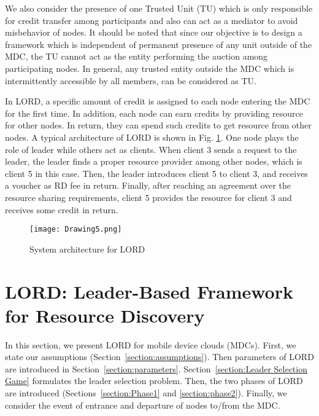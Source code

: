 \documentclass[journal,12pt, onecolumn]{IEEEtran}
\begin{document}
We also consider the presence of one Trusted Unit (TU) which is only responsible for credit transfer among participants \cite{x23} and also can act as a mediator \cite{x500} to avoid misbehavior of nodes. It should be noted that since our objective is to design a framework which is independent of permanent presence of any unit outside of the MDC, the TU cannot act as the entity performing the auction among participating nodes. In general, any trusted entity outside the MDC which is intermittently accessible by all members, can be considered as TU. 


In LORD, a specific amount of credit is assigned to each node entering the MDC for the first time. In addition, each node can earn credits by providing resource for other nodes. In return, they can spend such credits to get resource from other nodes.
A typical architecture of LORD is shown in Fig. \ref{figure 2}. One node plays the role of leader while others act as clients. When client 3 sends a request to the leader, the leader finds a proper resource provider among other nodes, which is client 5 in this case. Then, the leader introduces client 5 to client 3, and receives a voucher as RD fee in return. Finally, after reaching an agreement over the resource sharing requirements, client 5 provides the resource for client 3 and receives some credit in return. 
\begin{figure}[t]
\begin{center}
\texttt{[image: Drawing5.png]}
\caption{System architecture for LORD}
\label{figure 2}
\end{center}
\end{figure}

\section{LORD: Leader-Based Framework for Resource Discovery} \label{section:model}

In this section, we present LORD for mobile device clouds (MDCs). First, we state our assumptions (Section~\ref{section:assumptions}). Then parameters of LORD are introduced in Section~\ref{section:parameters}. Section~\ref{section:Leader Selection Game} formulates the leader selection problem. Then, the two phases of LORD are introduced (Sections~\ref{section:Phase1} and \ref{section:phase2}). Finally, we consider the event of entrance and departure of nodes to/from the MDC.   
\end{document}
